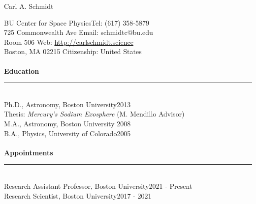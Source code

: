 \documentclass[12pt]{report}
\begin{document}
\newpage  
{\noindent}{\Large Carl A. Schmidt} \\ %
%
%

%
\thispagestyle{myheadings}

\noindent BU Center for Space Physics\hfill Tel: (617) 358-5879\\
725 Commonwealth Ave \hfill Email: schmidtc@bu.edu\\
Room 506 \hfill Web: \url{http://carlschmidt.science}\\
Boston, MA 02215 \hfill Citizenship: United States\\
\vspace{2 mm}\\
\bf{Education}\rm\\
\rule{\textwidth}{1pt}\\
\noindent Ph.D., Astronomy, Boston University\hfill 2013\\
\indent Thesis: {\it Mercury's Sodium Exosphere} (M. Mendillo Advisor)\\
\noindent M.A., Astronomy, Boston University \hfill 2008\\
\noindent B.A., Physics, University of Colorado\hfill 2005\\
\vspace{2 mm}\\
\bf{Appointments}\rm\\
\rule{\textwidth}{1pt}\\
\noindent Research Assistant Professor, Boston University\hfill 2021 - Present\\
\noindent Research Scientist, Boston University\hfill 2017 - 2021\\
\end{document}
